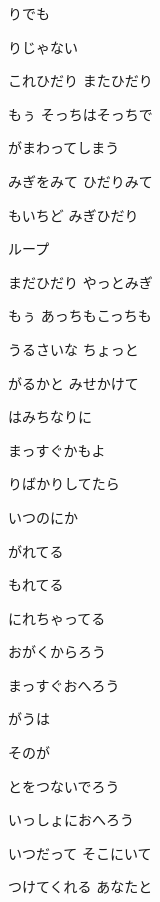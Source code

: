 \documentclass[14pt]{ltjsarticle}
\begin{document}
{\item
  りでも
  \jisho{}

  りじゃない
  \jisho{}

\item
  これひだり またひだり
  \jisho{}

  もぅ そっちはそっちで
  \jisho{}

  がまわってしまう
  \jisho{}

\item
  みぎをみて ひだりみて
  \jisho{}

  もいちど みぎひだり
  \jisho{}

  ループ
  \jisho{}

\item
  まだひだり やっとみぎ
  \jisho{}

  もぅ あっちもこっちも
  \jisho{}

  うるさいな ちょっと
  \jisho{}

\item
  がるかと みせかけて
  \jisho{}

  はみちなりに
  \jisho{}

  まっすぐかもよ
  \jisho{}

\item
  りばかりしてたら
  \jisho{}

  いつのにか
  \jisho{}

  がれてる
  \jisho{}

  もれてる
  \jisho{}

  にれちゃってる
  \jisho{}

\item
  おがくからろう
  \jisho{}

  まっすぐおへろう
  \jisho{}

  がうは
  \jisho{}

  そのが
  \jisho{}

\item
  とをつないでろう
  \jisho{}

  いっしょにおへろう
  \jisho{}

  いつだって そこにいて
  \jisho{}

  つけてくれる あなたと
  \jisho{}

}
\end{document}
